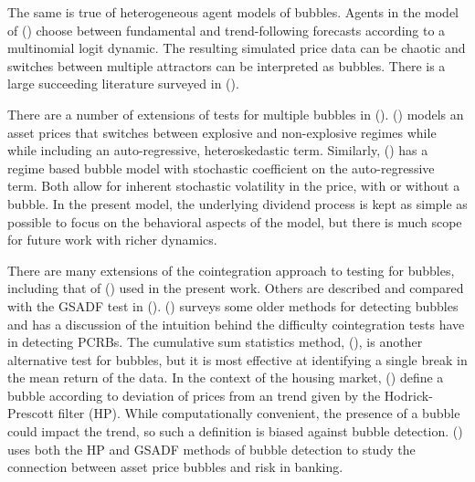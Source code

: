 \documentclass[12pt]{article}
\begin{document}
The same is true of heterogeneous agent models of bubbles. Agents in the model of \citeauthor{brock1998heterogeneous} (\citeyear{brock1998heterogeneous}) choose between fundamental and trend-following forecasts according to a multinomial logit dynamic. The resulting simulated price data can be chaotic and switches between multiple attractors can be interpreted as bubbles. There is a large succeeding literature surveyed in \citeauthor{DieciHe2018HetFinanceChapter} (\citeyear{DieciHe2018HetFinanceChapter}).

There are a number of extensions of tests for multiple bubbles in \citeauthor{phillips2015testing} (\citeyear{phillips2015testing}). \citeauthor{Harveyetal2025bubheterosked} (\citeyear{Harveyetal2025bubheterosked}) models an asset prices that switches between explosive and non-explosive regimes while while including an auto-regressive, heteroskedastic term. Similarly, \citeauthor{Kurozumietal2025bubstochcoeff} (\citeyear{Kurozumietal2025bubstochcoeff}) has a regime based bubble model with stochastic coefficient on the auto-regressive term. Both allow for inherent stochastic volatility in the price, with or without a bubble. In the present model, the underlying dividend process is kept as simple as possible to focus on the behavioral aspects of the model, but there is much scope for future work with richer dynamics. 

There are many extensions of the cointegration approach to testing for bubbles, including that of \citeauthor{TaylorPeel1998} (\citeyear{TaylorPeel1998}) used in the present work. Others are described and compared with the GSADF test in \citeauthor{hommbreitung12bubtests} (\citeyear{hommbreitung12bubtests}). \citeauthor{Gürkaynak2008bubsurvey} (\citeyear{Gürkaynak2008bubsurvey}) surveys some older methods for detecting bubbles and has a discussion of the intuition behind the difficulty cointegration tests have in detecting PCRBs. The cumulative sum statistics method, \citeauthor{Boubaker2022CUSUM} (\citeyear{Boubaker2022CUSUM}), is another alternative test for bubbles, but it is most effective at identifying a single break in the mean return of the data. In the context of the housing market, \citeauthor{Jorda2015leveragedbubs} (\citeyear{Jorda2015leveragedbubs}) define a bubble according to deviation of prices from an trend given by the Hodrick-Prescott filter (HP). While computationally convenient, the presence of a bubble could impact the trend, so such a definition is biased against bubble detection. \citeauthor{brunnermeieretal20bubsbanks} (\citeyear{brunnermeieretal20bubsbanks}) uses both the HP and GSADF methods of bubble detection to study the connection between asset price bubbles and risk in banking.
\end{document}
